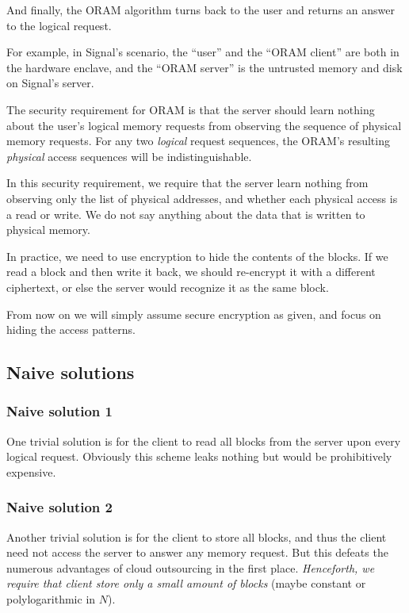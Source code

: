 And finally, the ORAM algorithm turns back to the user and returns an
answer to the logical request.

For example, in Signal's scenario, the ``user'' and the ``ORAM client''
are both in the hardware enclave, and the ``ORAM server'' is the
untrusted memory and disk on Signal's server.

The security requirement for ORAM is that the server should learn
nothing about the user's logical memory requests from observing the
sequence of physical memory requests. For any two \emph{logical} request
sequences, the ORAM's resulting \emph{physical} access sequences will be
indistinguishable.

\begin{remark}
In this security requirement, we require that the server learn nothing
from observing only the list of physical addresses, and whether each
physical access is a read or write. We do not say anything about the
data that is written to physical memory.

In practice, we need to use encryption to hide the contents of the
blocks. If we read a block and then write it back, we should re-encrypt
it with a different ciphertext, or else the server would recognize it as
the same block.

From now on we will simply assume secure encryption as given, and focus
on hiding the access patterns.
\end{remark}

\subsection{Naive solutions}\label{naive-solutions}

\subsubsection{Naive solution 1}\label{naive-solution-1.}

One trivial solution is for the client to read all blocks from the
server upon every logical request. Obviously this scheme leaks nothing
but would be prohibitively expensive.

\subsubsection{Naive solution 2}\label{naive-solution-2.}

Another trivial solution is for the client to store all blocks, and thus
the client need not access the server to answer any memory request. But
this defeats the numerous advantages of cloud outsourcing in the first
place. \emph{Henceforth, we require that client store only a small
amount of blocks} (maybe constant or polylogarithmic in \(N\)).

